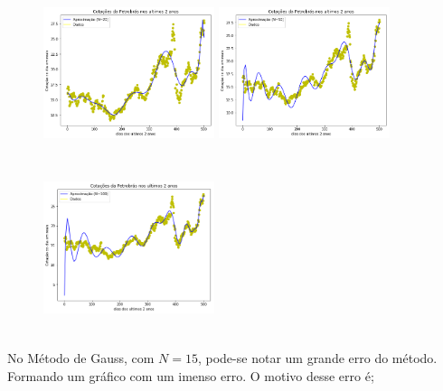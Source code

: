 \documentclass{article}
\begin{document}
\begin{figure}[!htb]
\includegraphics [width=5cm,height=5cm]{Gauss/G20.png}
\includegraphics [width=5cm,height=5cm]{Gauss/G50.png}
\includegraphics [width=5cm,height=5cm]{Gauss/G100.png}
\end{figure}

\text No Método de Gauss, com $N = 15$, pode-se notar um grande erro do método. Formando um gráfico com um imenso erro.  O motivo desse erro é;

\newpage
\end{document}
